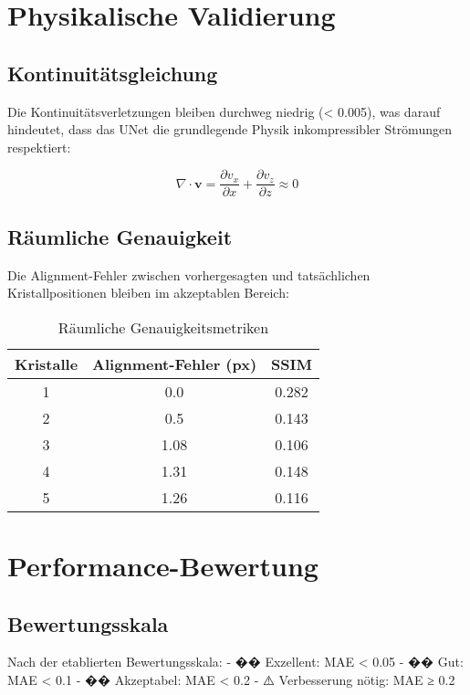 \documentclass[12pt,twoside,openright]{scrreprt}
\newcommand{\divg}{\nabla \cdot}
\theoremstyle{definition}
\theoremstyle{plain}
\begin{document}
\section{Physikalische Validierung}

\subsection{Kontinuitätsgleichung}

Die Kontinuitätsverletzungen bleiben durchweg niedrig (< 0.005), was darauf hindeutet, dass das UNet die grundlegende Physik inkompressibler Strömungen respektiert:

\begin{equation}
\divg \mathbf{v} = \frac{\partial v_x}{\partial x} + \frac{\partial v_z}{\partial z} \approx 0
\end{equation}

\subsection{Räumliche Genauigkeit}

Die Alignment-Fehler zwischen vorhergesagten und tatsächlichen Kristallpositionen bleiben im akzeptablen Bereich:

\begin{table}[htbp]
\centering
\caption{Räumliche Genauigkeitsmetriken}
\label{tab:spatial_accuracy}
\begin{tabular}{@{}ccc@{}}
\toprule
\textbf{Kristalle} & \textbf{Alignment-Fehler (px)} & \textbf{SSIM} \\
\midrule
1 & 0.0 & 0.282 \\
2 & 0.5 & 0.143 \\
3 & 1.08 & 0.106 \\
4 & 1.31 & 0.148 \\
5 & 1.26 & 0.116 \\
\bottomrule
\end{tabular}
\end{table}

\section{Performance-Bewertung}

\subsection{Bewertungsskala}

Nach der etablierten Bewertungsskala:
- �� Exzellent: MAE < 0.05
- �� Gut: MAE < 0.1  
- �� Akzeptabel: MAE < 0.2
- ⚠️ Verbesserung nötig: MAE ≥ 0.2
\end{document}
